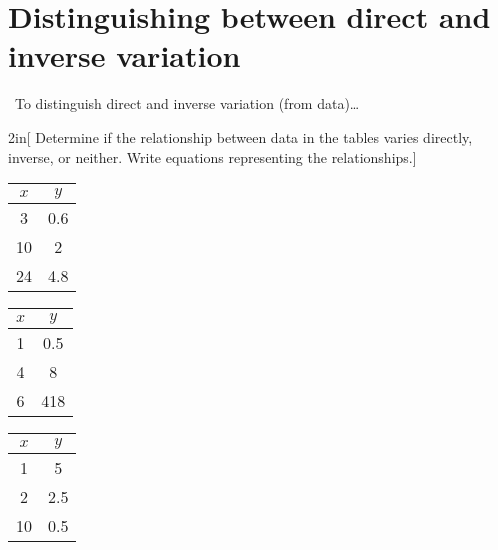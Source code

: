 \section{Distinguishing between direct and inverse variation}

\begin{myConceptSteps}{~To distinguish direct and inverse variation (from data)\dots}
\end{myConceptSteps}


\newpage
\begin{my2Problems}{2in}[%
    Determine if the relationship between data in the tables varies directly, inverse, or neither.
    Write equations representing the relationships.]
    {
        \centering
        \begin{tabular}{c|c}
            $x$ & $y$ \\
            \hline\hline
            3 & 0.6 \\
            10 & 2 \\
            24 & 4.8 
        \end{tabular}
    }
    {
        \centering
        \begin{tabular}{c|c}
            $x$ & $y$ \\
            \hline\hline
            1 & 0.5 \\
            4 & 8 \\
            6 & 418 
        \end{tabular}
    }
\end{my2Problems}
\begin{myProblem}{2in}
    {
        \centering
        \begin{tabular}{c|c}
            $x$ & $y$ \\
            \hline\hline
            1 & 5 \\
            2 & 2.5 \\
            10 & 0.5 
        \end{tabular}
    }
\end{myProblem}

